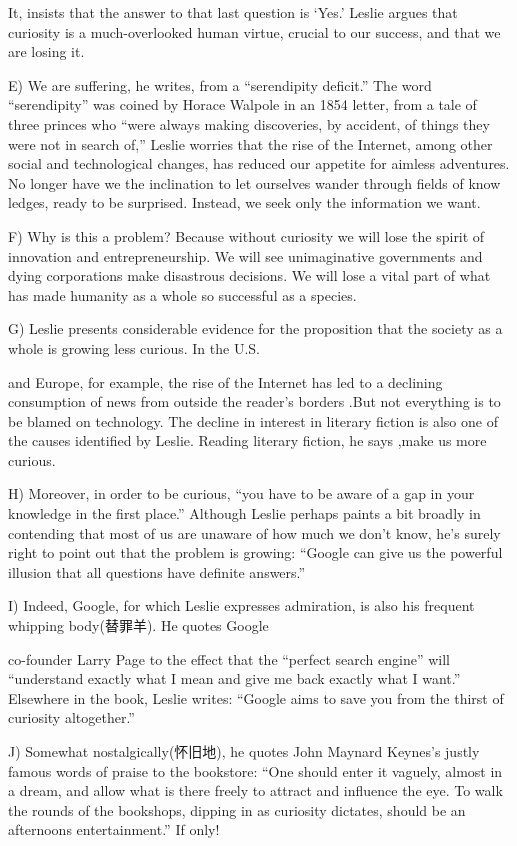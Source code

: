 \documentclass[UTF8,11pt]{ctexart}
\begin{document}
It, insists that the answer to that last question is ‘Yes.’ Leslie argues that curiosity is a much-overlooked human virtue, crucial to our success, and that we are losing it.


E) We are suffering, he writes, from a “serendipity deficit.” The word “serendipity” was coined by Horace Walpole in an 1854 letter, from a tale of three princes who “were always making discoveries, by accident, of things they were not in search of,” Leslie worries that the rise of the Internet, among other social and technological changes, has reduced our appetite for aimless adventures. No longer have we the inclination to let ourselves wander through fields of know ledges, ready to be surprised. Instead, we seek only the information we want.


F) Why is this a problem? Because without curiosity we will lose the spirit of innovation and entrepreneurship. We will see unimaginative governments and dying corporations make disastrous decisions. We will lose a vital part of what has made humanity as a whole so successful as a species.


G) Leslie presents considerable evidence for the proposition that the society as a whole is growing less curious. In the U.S.


and Europe, for example, the rise of the Internet has led to a declining consumption of news from outside the reader’s borders .But not everything is to be blamed on technology. The decline in interest in literary fiction is also one of the causes identified by Leslie. Reading literary fiction, he says ,make us more curious.


H) Moreover, in order to be curious, “you have to be aware of a gap in your knowledge in the first place.” Although Leslie perhaps paints a bit broadly in contending that most of us are unaware of how much we don’t know, he’s surely right to point out that the problem is growing: “Google can give us the powerful illusion that all questions have definite answers.”


I) Indeed, Google, for which Leslie expresses admiration, is also his frequent whipping body(替罪羊). He quotes Google


co-founder Larry Page to the effect that the “perfect search engine” will “understand exactly what I mean and give me back exactly what I want.” Elsewhere in the book, Leslie writes: “Google aims to save you from the thirst of curiosity altogether.”


J) Somewhat nostalgically(怀旧地), he quotes John Maynard Keynes’s justly famous words of praise to the bookstore: “One should enter it vaguely, almost in a dream, and allow what is there freely to attract and influence the eye. To walk the rounds of the bookshops, dipping in as curiosity dictates, should be an afternoons entertainment.” If only!
\end{document}
